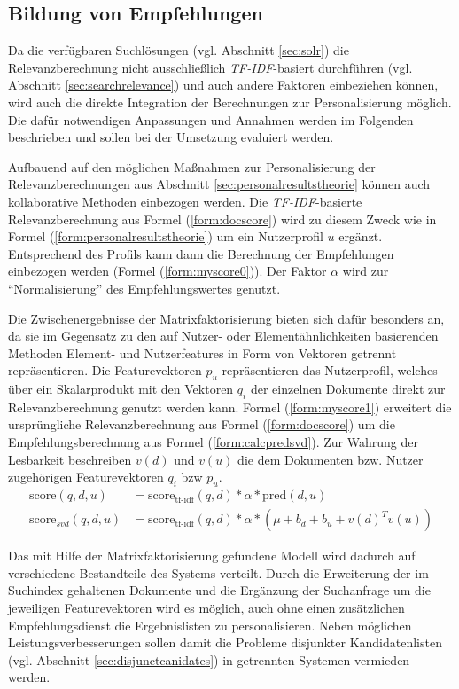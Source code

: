 \subsection{Bildung von Empfehlungen}\label{sec:myrecommend}

Da die verfügbaren Suchlösungen (vgl. Abschnitt \ref{sec:solr}) die Relevanzberechnung nicht ausschließlich \textit{TF-IDF}-basiert durchführen (vgl. Abschnitt \ref{sec:searchrelevance}) und auch andere Faktoren einbeziehen können, wird auch die direkte Integration der Berechnungen zur Personalisierung möglich. Die dafür notwendigen Anpassungen und Annahmen werden im Folgenden beschrieben und sollen bei der Umsetzung evaluiert werden.

Aufbauend auf den möglichen Maßnahmen zur Personalisierung der Relevanzberechnungen aus Abschnitt  \ref{sec:personalresultstheorie} können auch kollaborative Methoden einbezogen werden. Die \textit{TF-IDF}-basierte Relevanzberechnung aus Formel (\ref{form:docscore}) wird zu diesem Zweck wie in Formel (\ref{form:personalresultstheorie}) um  ein Nutzerprofil $u$ ergänzt. Entsprechend des Profils kann dann die Berechnung der Empfehlungen einbezogen werden (Formel (\ref{form:myscore0})). Der Faktor $\alpha$ wird zur ``Normalisierung'' des Empfehlungswertes genutzt.

Die Zwischenergebnisse der Matrixfaktorisierung bieten sich dafür besonders an, da sie im Gegensatz zu den auf Nutzer- oder Elementähnlichkeiten basierenden Methoden Element- und Nutzerfeatures in Form von Vektoren getrennt repräsentieren. Die Featurevektoren $p_u$ repräsentieren das Nutzerprofil, welches über ein Skalarprodukt  mit den Vektoren $q_i$ der einzelnen Dokumente direkt zur Relevanzberechnung genutzt werden kann. Formel (\ref{form:myscore1}) erweitert die ursprüngliche Relevanzberechnung aus Formel (\ref{form:docscore}) um die Empfehlungsberechnung aus Formel (\ref{form:calcpredsvd}). Zur Wahrung der Lesbarkeit beschreiben $v(d)$ und $v(u)$ die dem Dokumenten bzw. Nutzer zugehörigen Featurevektoren $q_i$ bzw $p_u$.
\begin{align}
\text{score}(q,d,u) & = \text{score}_{\text{tf-idf}}(q,d) * \alpha * \text{pred}(d, u)\label{form:myscore0} \\
\text{score}_{svd}(q,d,u) & = \text{score}_{\text{tf-idf}}(q,d) * \alpha * (\mu + b_d + b_u + v(d)^Tv(u)) \label{form:myscore1}
\end{align}

Das mit Hilfe der Matrixfaktorisierung gefundene Modell wird dadurch auf verschiedene Bestandteile des Systems verteilt. Durch die Erweiterung der im Suchindex gehaltenen Dokumente und die Ergänzung der Suchanfrage um die jeweiligen Featurevektoren wird es möglich, auch ohne einen zusätzlichen Empfehlungsdienst die Ergebnislisten zu personalisieren. Neben möglichen Leistungsverbesserungen sollen damit die Probleme disjunkter Kandidatenlisten (vgl. Abschnitt \ref{sec:disjunctcanidates}) in getrennten Systemen vermieden werden.

